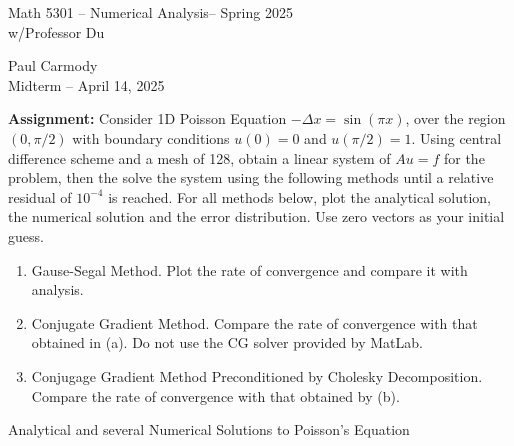 \documentclass[12pt,a4paper]{report}
\newcommand{\CLASSNAME}{Math 5301 -- Numerical Analysis}
\newcommand{\STUDENTNAME}{Paul Carmody}
\newcommand{\ASSIGNMENT}{Midterm }
\newcommand{\DUEDATE}{April 14, 2025}
\newcommand{\SEMESTER}{Spring 2025}
\begin{document}

\begin{center}
	\Large{\CLASSNAME -- \SEMESTER} \\
	\large{ w/Professor Du}
\end{center}
\begin{center}
	\STUDENTNAME \\
	\ASSIGNMENT -- \DUEDATE\\
\end{center} 
\HLINE

\textbf{Assignment:} Consider 1D Poisson Equation $-\Delta x = \sin (\pi x)$, over the region $(0, \pi/2)$ with boundary conditions $u(0)=0$ and $u(\pi/2)=1$.  Using central difference scheme and a mesh of 128, obtain a linear system of $Au = f$ for the problem, then the solve the system using the following methods until a relative residual of $10^{-4}$ is reached. For all methods below, plot the analytical solution, the numerical solution and the error distribution.  Use zero vectors as your initial guess.

\begin{enumerate}[label=(\alph*)]
\item Gause-Segal Method.  Plot the rate of convergence and compare it with analysis.
\item Conjugate Gradient Method. Compare the rate of convergence with that obtained in (a).  Do not use the CG solver provided by MatLab.
\item Conjugage Gradient Method Preconditioned by Cholesky Decomposition.  Compare the rate of convergence with that obtained by (b).

\end{enumerate}
\HLINE
%
%
%
%
\begin{center}
	\Large{Analytical and several Numerical Solutions to Poisson's Equation}
\end{center}
\end{document}
